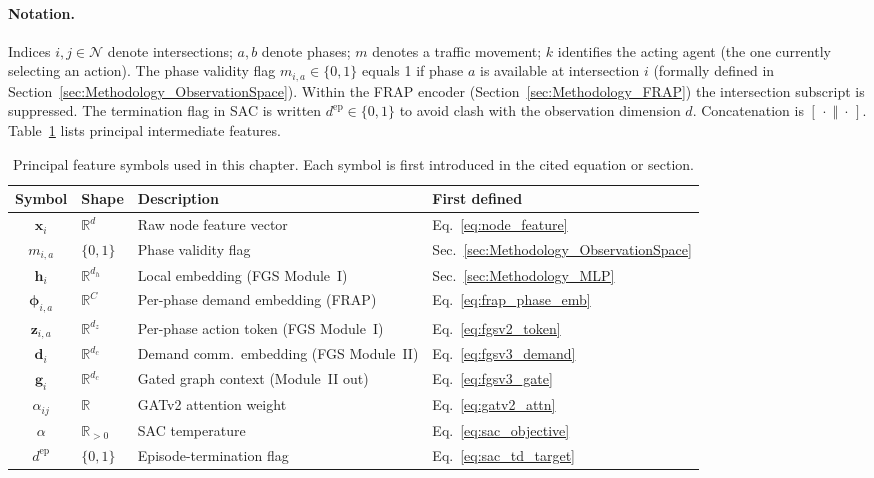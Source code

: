 \paragraph{Notation.}
Indices $i,j\in\mathcal{N}$ denote intersections; $a,b$ denote phases; $m$ denotes a traffic movement; $k$ identifies the acting agent (the one currently selecting an action). The phase validity flag $m_{i,a}\in\{0,1\}$ equals 1 if phase $a$ is available at intersection $i$ (formally defined in Section~\ref{sec:Methodology_ObservationSpace}). Within the FRAP encoder (Section~\ref{sec:Methodology_FRAP}) the intersection subscript is suppressed. The termination flag in SAC is written $d^{\mathrm{ep}}\in\{0,1\}$ to avoid clash with the observation dimension $d$. Concatenation is $[\,\cdot\;\Vert\;\cdot\,]$. Table~\ref{tab:notation} lists principal intermediate features.

\begin{table}[ht]
  \centering
  \caption{Principal feature symbols used in this chapter. Each symbol is first introduced in the cited equation or section.}
  \label{tab:notation}
  \small
  \setlength{\tabcolsep}{5pt}
  \begin{tabular}{clll}
    \toprule
    \textbf{Symbol}           & \textbf{Shape}     & \textbf{Description}                & \textbf{First defined}                         \\
    \midrule
    $\mathbf{x}_i$            & $\mathbb{R}^d$     & Raw node feature vector             & Eq.~\ref{eq:node_feature}                      \\
    $m_{i,a}$                 & $\{0,1\}$          & Phase validity flag                 & Sec.~\ref{sec:Methodology_ObservationSpace}    \\
    $\mathbf{h}_i$            & $\mathbb{R}^{d_h}$ & Local embedding (FGS Module~I)      & Sec.~\ref{sec:Methodology_MLP}                 \\
    $\boldsymbol{\phi}_{i,a}$ & $\mathbb{R}^C$     & Per-phase demand embedding (FRAP)   & Eq.~\ref{eq:frap_phase_emb}                    \\
    $\mathbf{z}_{i,a}$        & $\mathbb{R}^{d_z}$ & Per-phase action token (FGS Module~I)   & Eq.~\ref{eq:fgsv2_token}    \\
    $\mathbf{d}_i$            & $\mathbb{R}^{d_c}$ & Demand comm.\ embedding (FGS Module~II) & Eq.~\ref{eq:fgsv3_demand}   \\
    $\mathbf{g}_i$            & $\mathbb{R}^{d_c}$ & Gated graph context (Module~II out)     & Eq.~\ref{eq:fgsv3_gate}     \\
    $\alpha_{ij}$             & $\mathbb{R}$       & GATv2 attention weight              & Eq.~\ref{eq:gatv2_attn}                        \\
    $\alpha$                  & $\mathbb{R}_{>0}$  & SAC temperature                     & Eq.~\ref{eq:sac_objective}                     \\
    $d^{\mathrm{ep}}$         & $\{0,1\}$          & Episode-termination flag            & Eq.~\ref{eq:sac_td_target}                     \\
    \bottomrule
  \end{tabular}
\end{table}

